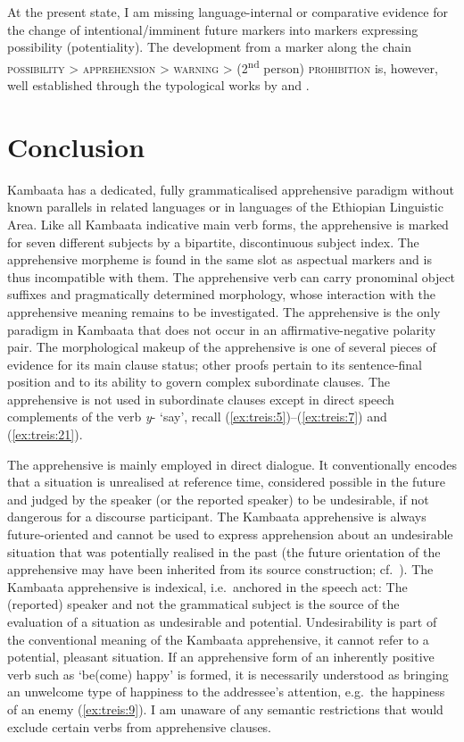 \documentclass[output=paper,colorlinks,citecolor=brown,
]{langsci/langscibook}
\begin{document}
\largerpage
At the present state, I am missing language-internal or comparative evidence for the change of intentional\slash imminent future markers into markers expressing possibility (potentiality). The development from a marker along the chain \textsc{possibility > apprehension > warning} > (2\textsuperscript{nd} person) \textsc{prohibition} is, however, well established through the typological works by \citet{Dobrushina2006} and \citet{pakendorfschalley2007}.




\section{Conclusion}\label{sec:treis:6}

Kambaata has a dedicated, fully grammaticalised apprehensive paradigm without known parallels in related languages or in languages of the Ethiopian Linguistic Area. Like all Kambaata indicative main verb forms, the apprehensive is marked for seven different subjects by a bipartite, discontinuous subject index. The apprehensive morpheme is found in the same slot as aspectual markers and is thus incompatible with them. The apprehensive verb can carry pronominal object suffixes and pragmatically determined morphology, whose interaction with the apprehensive meaning remains to be investigated. The apprehensive is the only paradigm in Kambaata that does not occur in an affirmative-negative polarity pair. The morphological makeup of the apprehensive is one of several pieces of evidence for its main clause status; other proofs pertain to its sentence-final position and to its ability to govern complex subordinate clauses. The apprehensive is not used in subordinate clauses except in direct speech complements of the verb \textit{y}- `say', recall (\ref{ex:treis:5})--(\ref{ex:treis:7}) and (\ref{ex:treis:21}).

The apprehensive is mainly employed in direct dialogue. It conventionally encodes that a situation is unrealised at reference time, considered possible in the future and judged by the speaker (or the reported speaker) to be undesirable, if not dangerous for a discourse participant. The Kambaata apprehensive is always future-oriented and cannot be used to express apprehension about an undesirable situation that was potentially realised in the past (the future orientation of the apprehensive may have been inherited from its source construction; cf.\   ). The Kambaata apprehensive is indexical,  i.e.\ anchored in the speech act: The (reported) speaker and not the grammatical subject is the source of the evaluation of a situation as undesirable and potential. Undesirability is part of the conventional meaning of the Kambaata apprehensive, it cannot refer to a potential, pleasant situation. If an apprehensive form of an inherently positive verb such as `be(come) happy' is formed, it is necessarily understood as bringing an unwelcome type of happiness to the addressee's attention,  e.g.\ the happiness of an enemy (\ref{ex:treis:9}). I am unaware of any semantic restrictions that would exclude certain verbs from apprehensive clauses.
\end{document}
